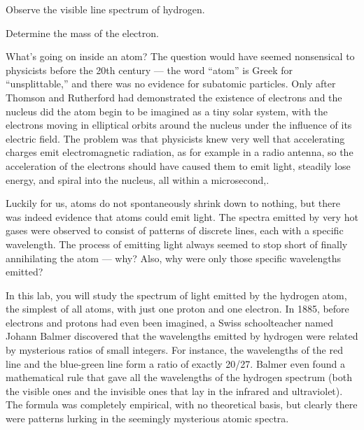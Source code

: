 \label{lab:hydrogen}

\apparatus
{}

\begin{goals}

\item[] Observe the visible line spectrum of hydrogen.

\item[] Determine the mass of the electron.
\end{goals}

\introduction

What's going on inside an atom? The question would have
seemed nonsensical to physicists before the 20th century ---
the word ``atom'' is Greek for ``unsplittable,'' and there
was no evidence for subatomic particles. Only after Thomson
and Rutherford had demonstrated the existence of electrons
and the nucleus did the atom begin to be imagined as a tiny
solar system, with the electrons moving in elliptical orbits
around the nucleus under the influence of its electric
field. The problem was that physicists knew very well that
accelerating charges emit electromagnetic radiation, as for
example in a radio antenna, so the acceleration of the
electrons should have caused them to emit light, steadily
lose energy, and spiral into the nucleus, all within a microsecond,.

Luckily for us, atoms do not spontaneously shrink down to
nothing, but there was indeed evidence that atoms could emit
light. The spectra emitted by very hot gases were observed
to consist of patterns of discrete lines, each with a
specific wavelength. The process of emitting light always
seemed to stop short of finally annihilating the atom ---
why? Also, why were only those specific wavelengths emitted?

In this lab, you will study the spectrum of light emitted by
the hydrogen atom, the simplest of all atoms, with just one
proton and one electron. In 1885, before electrons and
protons had even been imagined, a Swiss schoolteacher named
Johann Balmer discovered that the wavelengths emitted by
hydrogen were related by mysterious ratios of small
integers. For instance, the wavelengths of the red line and
the blue-green line form a ratio of exactly 20/27. Balmer
even found a mathematical rule that gave all the wavelengths
of the hydrogen spectrum (both the visible ones and the
invisible ones that lay in the infrared and ultraviolet).
The formula was completely empirical, with no theoretical
basis, but clearly there were patterns lurking in the
seemingly mysterious atomic spectra.

